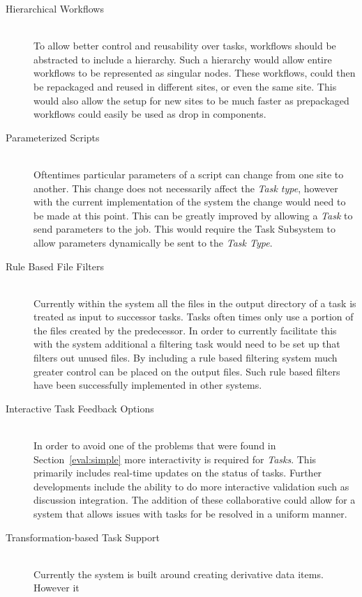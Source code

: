 \documentclass[12pt,a4paper]{report}
\begin{document}
\begin{description}
\item[Hierarchical Workflows]\hfill \\
To allow better control and reusability over tasks, workflows should be
abstracted to include a hierarchy. Such a hierarchy would allow entire workflows
to be represented as singular nodes. These workflows, could then be repackaged
and reused in different sites, or even the same site. This would also allow the
setup for new sites to be much faster as prepackaged workflows could easily be
used as drop in components.
\item[Parameterized Scripts]\hfill \\
Oftentimes particular parameters of a script can change from one site to
another. This change does not necessarily affect the \emph{Task type}, however
with the current implementation of the system the change would need to be made
at this point. This can be greatly improved by allowing a \emph{Task} to send
parameters to the job. This would require the Task Subsystem to allow parameters
dynamically be sent to the \emph{Task Type}.
\item[Rule Based File Filters]\hfill \\
Currently within the system all the files in the output directory of a task is
treated as input to successor tasks. Tasks often times only use a portion of the
files created by the predecessor. In order to currently facilitate this with the
system additional a filtering task would need to be set up that filters out
unused files. By including a rule based filtering system much greater control
can be placed on the output files. Such rule based filters have been
successfully implemented in other systems\cite{conery2005rule}.
\item[Interactive Task Feedback Options]\hfill \\
In order to avoid one of the problems that were found in Section~\ref{eval:simple}
more interactivity is required for \emph{Tasks}. This primarily includes
real-time updates on the status of tasks. Further developments include the
ability to do more interactive validation such as discussion integration.
The addition of these collaborative could allow for a system that allows issues
with tasks for be resolved in a uniform manner\cite{guimaraes1998integration}.
\item[Transformation-based Task Support]\hfill \\
Currently the system is built around creating derivative data items. However it

\end{description}
\end{document}
